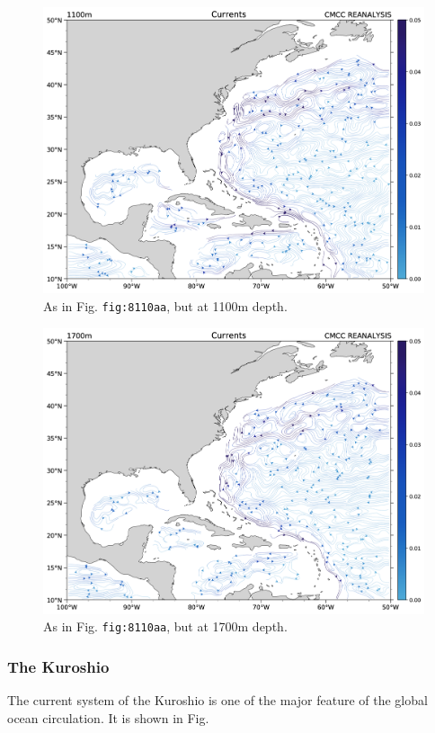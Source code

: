 \begin{figure}
\centering
\includegraphics[width = .7 \textwidth]{figs/GD/UVstream1100mATLCARIB.png}
\caption{As in Fig. \texttt{fig:8110aa}, but at 1100m depth.}
\end{figure}

\begin{figure}
\centering
\includegraphics[width = .7 \textwidth]{figs/GD/UVstream1700mATLCARIB.png}
\caption{As in Fig. \texttt{fig:8110aa}, but at 1700m depth.}
\end{figure}

\subsubsection{The Kuroshio}\label{the-kuroshio}

The current system of the Kuroshio is one of the major feature of the
global ocean circulation. It is shown in Fig.

